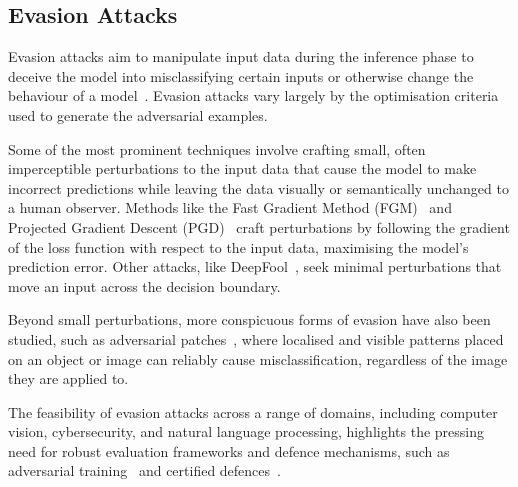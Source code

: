 \subsection{Evasion Attacks}
\label{subsec:evasion_attacks}
Evasion attacks aim to manipulate input data during the inference phase to deceive the model into misclassifying certain inputs or otherwise change the behaviour of a model~\cite{carlini_towards_2017,adversarialpatch,pixelattack,hopskipjump}. 
Evasion attacks vary largely by the optimisation criteria used to generate the adversarial examples.

Some of the most prominent techniques involve crafting small, often imperceptible perturbations to the input data that cause the model to make incorrect predictions while leaving the data visually or semantically unchanged to a human observer. 
Methods like the Fast Gradient Method (FGM)~\cite{fgm} and Projected Gradient Descent (PGD)~\cite{madry2017towards} craft perturbations by following the gradient of the loss function with respect to the input data, maximising the model’s prediction error. 
Other attacks, like DeepFool~\cite{deepfool}, seek minimal perturbations that move an input across the decision boundary.

Beyond small perturbations, more conspicuous forms of evasion have also been studied, such as adversarial patches~\cite{adversarialpatch}, where localised and visible patterns placed on an object or image can reliably cause misclassification, regardless of the image they are applied to.

The feasibility of evasion attacks across a range of domains, including computer vision, cybersecurity, and natural language processing, highlights the pressing need for robust evaluation frameworks and defence mechanisms, such as adversarial training~\cite{madry2017towards} and certified defences~\cite{gowal2018effectiveness}.
